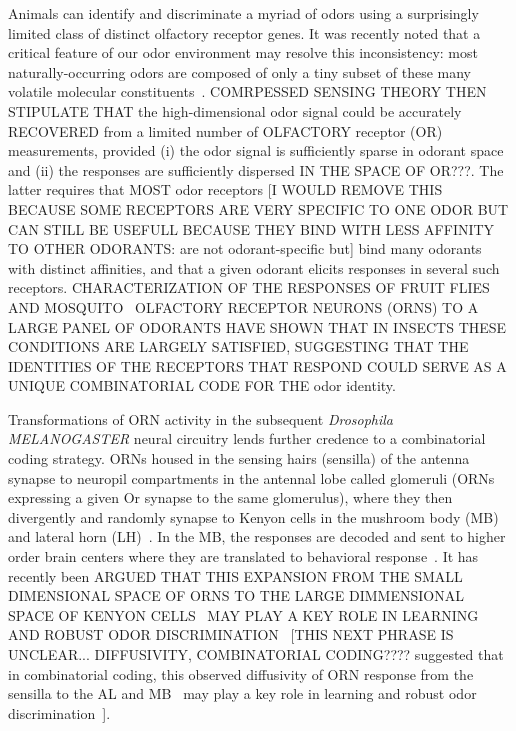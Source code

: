 
Animals can identify and discriminate a myriad of odors using a surprisingly limited class of distinct olfactory receptor genes. It was recently noted that a critical feature of our odor environment may resolve this inconsistency: most naturally-occurring odors are composed of only a tiny subset of these many volatile molecular constituents~\cite{vijay_1}. COMRPESSED SENSING THEORY THEN STIPULATE THAT the high-dimensional odor signal could be accurately RECOVERED from a limited number of OLFACTORY receptor (OR) measurements, provided (i) the odor signal is sufficiently sparse in odorant space and (ii) the responses are sufficiently dispersed IN THE SPACE OF OR???. The latter requires that MOST odor receptors [I WOULD REMOVE THIS BECAUSE SOME RECEPTORS ARE VERY SPECIFIC TO ONE ODOR BUT CAN STILL BE USEFULL BECAUSE THEY BIND WITH LESS AFFINITY TO OTHER ODORANTS: are not odorant-specific but] bind many odorants with distinct affinities, and that a given odorant elicits responses in several such receptors. CHARACTERIZATION OF THE RESPONSES OF FRUIT FLIES~\cite{hallem_carlson} AND MOSQUITO~\cite{} OLFACTORY RECEPTOR NEURONS (ORNS) TO A LARGE PANEL OF ODORANTS HAVE SHOWN THAT IN INSECTS THESE CONDITIONS ARE LARGELY SATISFIED, SUGGESTING THAT THE IDENTITIES OF THE RECEPTORS THAT RESPOND COULD SERVE AS A UNIQUE COMBINATORIAL CODE FOR THE odor identity. 

Transformations of ORN activity in the subsequent \textit{Drosophila MELANOGASTER} neural circuitry lends further credence to a combinatorial coding strategy. ORNs housed in the sensing hairs (sensilla) of the antenna synapse to neuropil compartments in the antennal lobe called glomeruli (ORNs expressing a given Or synapse to the same glomerulus), where they then divergently and randomly synapse to Kenyon cells in the mushroom body (MB) and lateral horn (LH)~\cite{early_olfactory_processing, abbott_axel}. In the MB, the responses are decoded and sent to higher order brain centers where they are translated to behavioral response~\cite{olfactory_map_chiang, mushroom_body_review}. It has recently been ARGUED THAT THIS EXPANSION FROM THE SMALL DIMENSIONAL SPACE OF ORNS TO THE LARGE DIMMENSIONAL SPACE OF KENYON CELLS~\cite{abbott_axel} MAY PLAY A KEY ROLE IN LEARNING AND ROBUST ODOR DISCRIMINATION~\cite{vijay_1} [THIS NEXT PHRASE IS UNCLEAR... DIFFUSIVITY, COMBINATORIAL CODING???? suggested that in combinatorial coding, this observed diffusivity of ORN response from the sensilla to the AL and MB~\cite{abbott_axel} may play a key role in learning and robust odor discrimination~\cite{vijay_1}].

